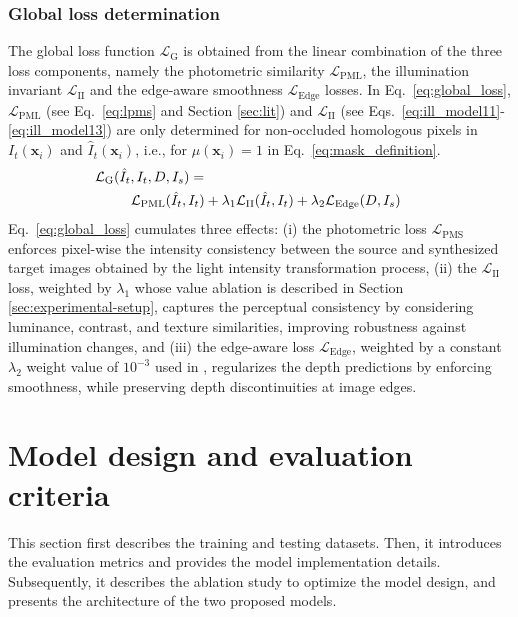 \documentclass[a4paper,fleqn]{cas-dc}
\begin{document}
{\subsubsection{Global loss determination}  
%
The global loss function $\mathcal{L}_{\textrm{G}}$ is obtained from the linear combination of the three loss components, namely the photometric similarity $\mathcal{L}_\textrm{PML}$, the illumination invariant $\mathcal{L}_\textrm{II}$ and the edge-aware smoothness $\mathcal{L}_{\textrm{Edge}}$ losses. In Eq.~\eqref{eq:global_loss}, $\mathcal{L}_\textrm{PML}$ (see Eq.~\eqref{eq:lpms} and Section \ref{sec:lit}) and $\mathcal{L}_\textrm{II}$ (see Eqs.~\eqref{eq:ill_model11}-\eqref{eq:ill_model13}) are only determined for non-occluded homologous pixels in $I_t(\mathbf{x}_i)$ and $\hat{I}_t(\mathbf{x}_i)$, i.e., for $\mu(\mathbf{x}_i) = 1$ in Eq.~\eqref{eq:mask_definition}. 
%
%
\begin{eqnarray} \label{eq:global_loss} \hspace{-6mm}
    \mathcal{L}_\textrm{G}(\hat{I}_{t},I_t,D, I_s) & = & \nonumber \\ & & \hspace{-22mm}
    \mathcal{L}_\textrm{PML}(\hat{I}_{t},I_t) + \lambda_1 \mathcal{L}_\textrm{II}(\hat{I}_t, I_t) + \lambda_2 \mathcal{L}_{\textrm{Edge}}(D, I_s)
\end{eqnarray}
%
%
Eq.~\eqref{eq:global_loss} cumulates three effects: (i) the photometric loss \( \mathcal{L}_{\text{PMS}} \) enforces pixel-wise the intensity consistency between the source and synthesized target images obtained by the light intensity transformation process, (ii) the  \( \mathcal{L}_\textrm{II} \) loss, weighted by \( \lambda_1 \) whose value ablation is described in Section \ref{sec:experimental-setup}, captures the perceptual consistency by considering luminance, contrast, and texture similarities, improving robustness against illumination changes, and (iii) the edge-aware loss \( \mathcal{L}_{\text{Edge}} \), weighted by a constant \( \lambda_2 \) weight value of \( 10^{-3} \) used in \citep{Godard_ICCV_2019,Shao_MIA_2022}, regularizes the depth predictions by enforcing smoothness, while preserving depth discontinuities at image edges.
%
%
\section{Model design and evaluation criteria\label{sec:experimental-setup}}
%
This section first describes the training and testing datasets. Then, it introduces the evaluation metrics and provides the model implementation details. Subsequently, it describes the ablation study to optimize the model design, and presents the architecture of the two proposed models.
%
}
\end{document}
